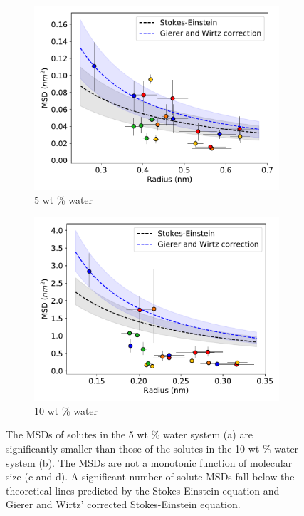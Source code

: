 \documentclass{article}
\begin{document}
\begin{figure}
\begin{subfigure}{0.45\linewidth}
  \includegraphics[width=\linewidth]{msd_radius_5wt.pdf}
  \caption{5 wt \% water}\label{fig:msd_radius_5wt}
  \end{subfigure}
  \begin{subfigure}{0.45\linewidth}
  \includegraphics[width=\linewidth]{msd_radius_10wt.pdf}
  \caption{10 wt \% water}\label{fig:msd_radius_10wt}
  \end{subfigure}
  \caption{The MSDs of solutes in the 5 wt \% water system (a) are significantly
  smaller than those of the solutes in the 10 wt \% water system (b). The
  MSDs are not a monotonic function of molecular size (c and d). A significant
  number of solute MSDs fall below the theoretical lines predicted by the
  Stokes-Einstein equation and Gierer and Wirtz' corrected Stokes-Einstein equation.
  }\label{fig:msds}
  \vspace{-0.4cm}
  \end{figure}
  
\end{document}
